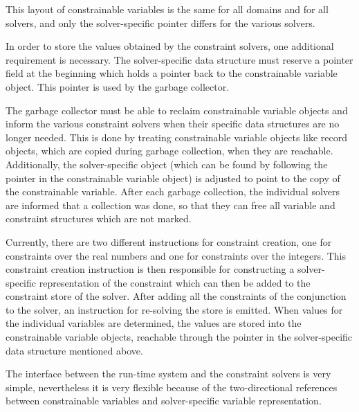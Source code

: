 This layout of constrainable variables is the same for all domains and
for all solvers, and only the solver-specific pointer differs for the
various solvers.

In order to store the values obtained by the constraint solvers, one
additional requirement is necessary.  The solver-specific data
structure must reserve a pointer field at the beginning which holds a
pointer back to the constrainable variable object.  This pointer is
used by the garbage collector.

The garbage collector must be able to reclaim constrainable variable
objects and inform the various constraint solvers when their specific
data structures are no longer needed.  This is done by treating
constrainable variable objects like record objects, which are copied
during garbage collection, when they are reachable.  Additionally, the
solver-specific object (which can be found by following the pointer in
the constrainable variable object) is adjusted to point to the copy of
the constrainable variable.  After each garbage collection, the
individual solvers are informed that a collection was done, so that
they can free all variable and constraint structures which are not
marked.


Currently, there are two different instructions for constraint
creation, one for constraints over the real numbers and one for
constraints over the integers.  This constraint creation instruction
is then responsible for constructing a solver-specific representation
of the constraint which can then be added to the constraint store of
the solver.  After adding all the constraints of the conjunction to
the solver, an instruction for re-solving the store is emitted.  When
values for the individual variables are determined, the values are
stored into the constrainable variable objects, reachable through the
pointer in the solver-specific data structure mentioned above.

The interface between the run-time system and the constraint solvers
is very simple, nevertheless it is very flexible because of the
two-directional references between constrainable variables and
solver-specific variable representation.

